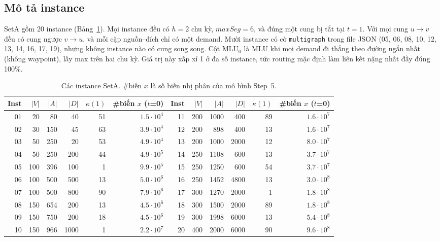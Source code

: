 \documentclass[11pt,a4paper]{article}
\begin{document}
\subsection{Mô tả instance}

SetA gồm 20 instance (Bảng~\ref{tab:inst}).
Mọi instance đều có $h=2$ chu kỳ, $maxSeg=6$, và đúng một cung bị tắt tại $t=1$.
Với mọi cung $u\to v$ đều có cung ngược $v\to u$, và mỗi cặp nguồn--đích chỉ có một demand.
Mười instance có cờ \texttt{multigraph} trong file JSON (05, 06, 08, 10, 12, 13, 14, 16, 17, 19), nhưng không instance nào có cung song song.
Cột MLU$_0$ là MLU khi mọi demand đi thẳng theo đường ngắn nhất (không waypoint), lấy max trên hai chu kỳ.
Giá trị này xấp xỉ 1 ở đa số instance, tức routing mặc định làm liên kết nặng nhất đầy đúng 100\%.

\begin{table}[h]
\centering\small
\begin{tabular}{@{}rrrrrr|rrrrrr@{}}
\toprule
Inst & $|V|$ & $|A|$ & $|D|$ & $\kappa(1)$ & \#biến $x$ ($t$=0) & Inst & $|V|$ & $|A|$ & $|D|$ & $\kappa(1)$ & \#biến $x$ ($t$=0)\\
\midrule
01 & 20 & 80 & 40 & 51 & $1.5\cdot10^4$ & 11 & 200 & 1000 & 400 & 89 & $1.6\cdot10^7$ \\
02 & 30 & 150 & 45 & 63 & $3.9\cdot10^4$ & 12 & 200 & 898 & 400 & 13 & $1.6\cdot10^7$ \\
03 & 50 & 250 & 20 & 53 & $4.9\cdot10^4$ & 13 & 200 & 1000 & 2000 & 12 & $8.0\cdot10^7$ \\
04 & 50 & 250 & 200 & 44 & $4.9\cdot10^5$ & 14 & 250 & 1108 & 600 & 13 & $3.7\cdot10^7$ \\
05 & 100 & 396 & 100 & 1 & $9.9\cdot10^5$ & 15 & 250 & 1250 & 600 & 54 & $3.7\cdot10^7$ \\
06 & 100 & 500 & 500 & 13 & $5.0\cdot10^6$ & 16 & 250 & 1452 & 4800 & 13 & $3.0\cdot10^8$ \\
07 & 100 & 500 & 800 & 90 & $7.9\cdot10^6$ & 17 & 300 & 1270 & 2000 & 1 & $1.8\cdot10^8$ \\
08 & 150 & 654 & 200 & 13 & $4.5\cdot10^6$ & 18 & 300 & 1500 & 2000 & 89 & $1.8\cdot10^8$ \\
09 & 150 & 750 & 200 & 18 & $4.5\cdot10^6$ & 19 & 300 & 1998 & 6000 & 13 & $5.4\cdot10^8$ \\
10 & 150 & 966 & 1000 & 1 & $2.2\cdot10^7$ & 20 & 400 & 2000 & 6000 & 90 & $9.6\cdot10^8$ \\
\bottomrule
\end{tabular}
\caption{Các instance SetA. \#biến $x$ là số biến nhị phân của mô hình Step~5.}\label{tab:inst}
\end{table}
\end{document}
